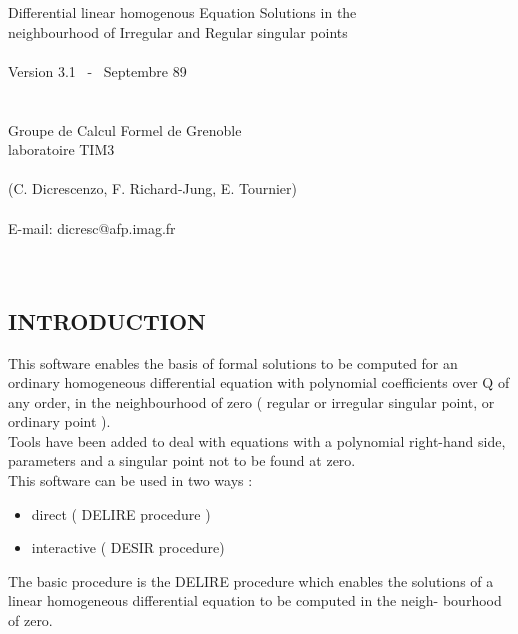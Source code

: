 

\begin{center}
Differential linear homogenous Equation Solutions in the \\
neighbourhood of Irregular and Regular singular points \\
\ \\
Version 3.1~ -~ Septembre 89 \\
\ \\
\ \\
Groupe de Calcul Formel de Grenoble \\
laboratoire TIM3 \\
\ \\
(C. Dicrescenzo, F. Richard-Jung, E. Tournier) \\
\ \\
E-mail: dicresc@afp.imag.fr \\
\ \\
\ \\
\end{center}


\subsection{INTRODUCTION}

This software enables the basis of formal solutions to be computed for an
ordinary homogeneous differential equation with polynomial coefficients
over Q of any order, in the neighbourhood of zero ( regular or irregular
singular point, or ordinary point ). \\
Tools have been added to deal with equations with a polynomial right-hand
side, parameters and a singular point not to be found at zero. \\

This software can be used in two ways : 
\begin{itemize}
\item direct ( DELIRE procedure )
\item interactive ( DESIR procedure)
\end{itemize}

The basic procedure is the DELIRE procedure which enables the solutions of
a linear homogeneous differential equation to be computed in the neigh-
bourhood of zero. \\

